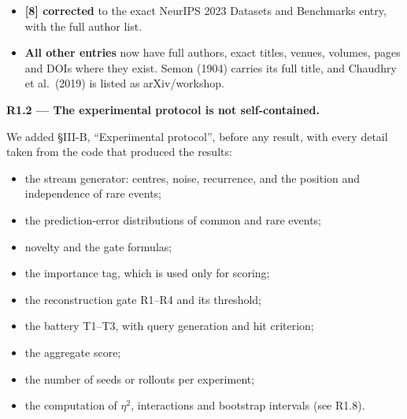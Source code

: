 \documentclass[11pt]{article}
\newcommand{\comment}[1]{\par\medskip\noindent\textbf{#1}\par}
\begin{document}
\begin{itemize}
sentence in §I is rewritten and now rests on Anderson and Schooler (1991),
memory availability tracking need probability, and Richards and Frankland
(2017), forgetting as a regulated process in the service of decision making.
\item \textbf{[8] corrected} to the exact NeurIPS 2023 Datasets and Benchmarks
entry, with the full author list.
\item \textbf{All other entries} now have full authors, exact titles, venues,
volumes, pages and DOIs where they exist. Semon (1904) carries its full title,
and Chaudhry et al.\ (2019) is listed as arXiv/workshop.
\end{itemize}

\comment{R1.2 --- The experimental protocol is not self-contained.}
We added §III-B, ``Experimental protocol'', before any result, with every
detail taken from the code that produced the results:
\begin{itemize}
\item the stream generator: centres, noise, recurrence, and the position and
independence of rare events;
\item the prediction-error distributions of common and rare events;
\item novelty and the gate formulas;
\item the importance tag, which is used only for scoring;
\item the reconstruction gate R1--R4 and its threshold;
\item the battery T1--T3, with query generation and hit criterion;
\item the aggregate score;
\item the number of seeds or rollouts per experiment;
\item the computation of $\eta^2$, interactions and bootstrap intervals (see R1.8).
\end{itemize}
\end{document}
